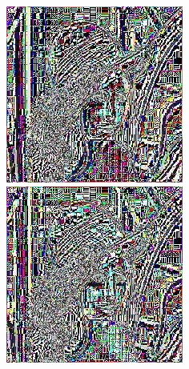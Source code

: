 \documentclass[a4paper,12pt]{article}
\begin{document}
\newpage
\begin{figure}[h]
    \centering
\begin{minipage}[h]{.45\linewidth}
\centering
\includegraphics[width=0.55\linewidth]{preconditioning/lena_av5}
\end{minipage}
\hfill
\begin{minipage}[h]{0.45\linewidth}
\centering
\includegraphics[width=0.55\linewidth]{preconditioning/lena_av6}
\end{minipage}
\end{figure}
\end{document}
